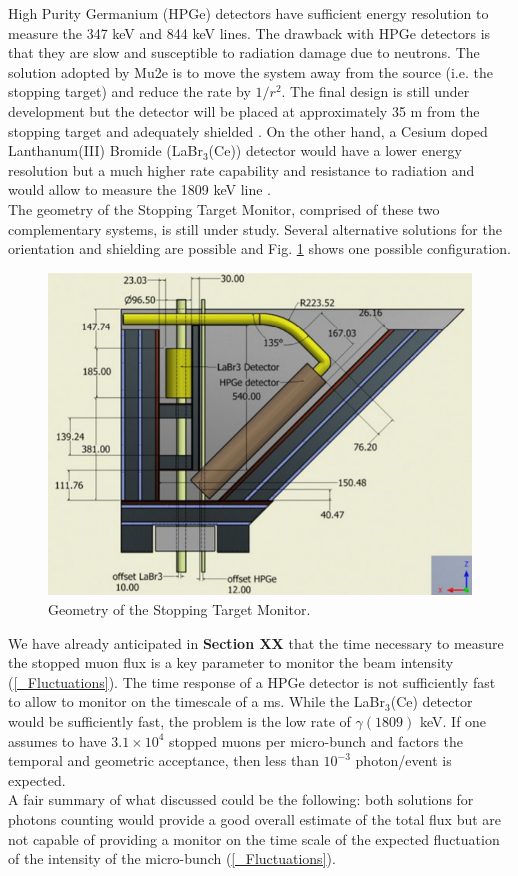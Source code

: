 \documentclass[12pt,a4paper,openright, oneside, titlepage]{book} %
\begin{document}
\noindent
High Purity Germanium (HPGe) detectors have sufficient energy resolution to measure the 347 keV and 844 keV lines. 
The drawback with HPGe detectors is that they are slow and susceptible to radiation damage due to neutrons. 
The solution adopted by Mu2e is to move the system away from the source (i.e. the stopping target) and
reduce the rate by $1/r^2$. 
The final design is still under development but the detector will be placed at approximately 35 m from the stopping target and adequately shielded \cite{STM:2016}. 
On the other hand, a Cesium doped Lanthanum(III) Bromide (LaBr$_3$(Ce)) detector would have a lower energy resolution but a much higher rate capability and resistance to radiation and would allow to measure the 1809 keV line \cite{LaBr3:2020}.\\
The geometry of the Stopping Target Monitor, comprised of these two complementary systems, is still under study. 
Several alternative solutions for the orientation and shielding are possible and Fig. \ref{_STM_geom} shows one possible configuration.

\begin{figure}[h!]
\centering
\includegraphics[scale=0.6]{STM_geom}
\caption[Geometry of the Stopping Target Monitor]{Geometry of the Stopping Target Monitor.}
\label{_STM_geom}
\end{figure}

\noindent
We have already anticipated in {\bf{Section XX}} that the time necessary to measure the stopped muon flux is a key parameter to monitor
the beam intensity (\ref{_Fluctuations}). 
The time response of a HPGe detector is not sufficiently fast to allow to monitor on the timescale of a ms.
While the LaBr$_3$(Ce) detector would be sufficiently fast, 
the problem is the low rate of $\gamma(1809)$ keV.
If one assumes to have $3.1\times10^4$ stopped muons per micro-bunch and factors 
the temporal and geometric acceptance, 
then less than $10^{-3}$ photon/event is expected.\\ 
A fair summary of what discussed could be the following: 
both solutions for photons counting would provide a good overall estimate of the total flux 
but are not capable of providing a monitor on the time scale of the expected fluctuation 
of the intensity of the micro-bunch (\ref{_Fluctuations}).
\end{document}
